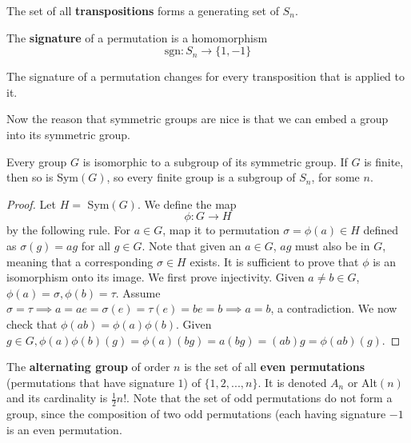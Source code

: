   \begin{theorem}[Transpositions]
    The set of all \textbf{transpositions} forms a generating set of $S_{n}$. 
  \end{theorem}

  \begin{definition}
    The \textbf{signature} of a permutation is a homomorphism
    \begin{equation}
      \text{sgn}: S_{n} \longrightarrow \{1, -1\}
    \end{equation}
  \end{definition}

  \begin{lemma}
    The signature of a permutation changes for every transposition that is applied to it. 
  \end{lemma}

  Now the reason that symmetric groups are nice is that we can embed a group into its symmetric group.  

  \begin{theorem}
    Every group $G$ is isomorphic to a subgroup of its symmetric group. If $G$ is finite, then so is Sym$(G)$, so every finite group is a subgroup of $S_{n}$, for some $n$.
  \end{theorem}
  \begin{proof}
    Let $H =$ Sym$(G)$. We define the map
    \begin{equation}
      \phi: G \longrightarrow H
    \end{equation}
    by the following rule. For $a \in G$, map it to permutation $\sigma = \phi (a) \in H$ defined as $\sigma(g) = a g$ for all $g \in G$. Note that given an $a \in G$, $a g$ must also be in $G$, meaning that a corresponding $\sigma \in H$ exists. It is sufficient to prove that $\phi$ is an isomorphism onto its image. We first prove injectivity. Given $a \neq b \in G$, $\phi(a)=\sigma, \phi(b) = \tau$. Assume $\sigma = \tau \implies a = a e =  \sigma(e) = \tau (e) = b e = b \implies a = b$, a contradiction. We now check that $\phi(a b) = \phi(a) \phi(b)$. Given $g \in G, \phi(a) \phi(b) (g) = \phi(a) (bg) = a(bg)= (ab) g = \phi(ab) (g).$
  \end{proof}

  \begin{definition}
    The \textbf{alternating group} of order $n$ is the set of all \textbf{even permutations} (permutations that have signature $1$) of $\{1, 2, ..., n\}$. It is denoted $A_{n}$ or Alt$(n)$ and its cardinality is $\frac{1}{2} n!$. Note that the set of odd permutations do not form a group, since the composition of two odd permutations (each having signature $-1$ is an even permutation. 
  \end{definition}

